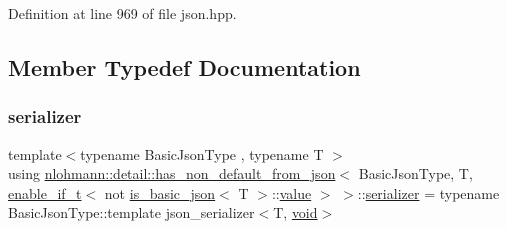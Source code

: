Definition at line 969 of file json.\+hpp.



\subsection{Member Typedef Documentation}
\mbox{\label{structnlohmann_1_1detail_1_1has__non__default__from__json_3_01_basic_json_type_00_01_t_00_01enab81bd4c814ac1146ff15f3f4636933207_a610272ed924122e0c46d158ecdfe6faf}} 
\subsubsection{\texorpdfstring{serializer}{serializer}}
{\footnotesize\ttfamily template$<$typename Basic\+Json\+Type , typename T $>$ \\
using \mbox{\hyperlink{structnlohmann_1_1detail_1_1has__non__default__from__json}{nlohmann\+::detail\+::has\+\_\+non\+\_\+default\+\_\+from\+\_\+json}}$<$ Basic\+Json\+Type, T, \mbox{\hyperlink{namespacenlohmann_1_1detail_a02bcbc878bee413f25b985ada771aa9c}{enable\+\_\+if\+\_\+t}}$<$ not \mbox{\hyperlink{structnlohmann_1_1detail_1_1is__basic__json}{is\+\_\+basic\+\_\+json}}$<$ T $>$\+::\mbox{\hyperlink{structnlohmann_1_1detail_1_1has__non__default__from__json_3_01_basic_json_type_00_01_t_00_01enab81bd4c814ac1146ff15f3f4636933207_a1494ac5fed1163aab4a89208ff04ee85}{value}} $>$ $>$\+::\mbox{\hyperlink{structnlohmann_1_1detail_1_1has__non__default__from__json_3_01_basic_json_type_00_01_t_00_01enab81bd4c814ac1146ff15f3f4636933207_a610272ed924122e0c46d158ecdfe6faf}{serializer}} =  typename Basic\+Json\+Type\+::template json\+\_\+serializer$<$T, \mbox{\hyperlink{namespacenlohmann_1_1detail_a59fca69799f6b9e366710cb9043aa77d}{void}}$>$}



